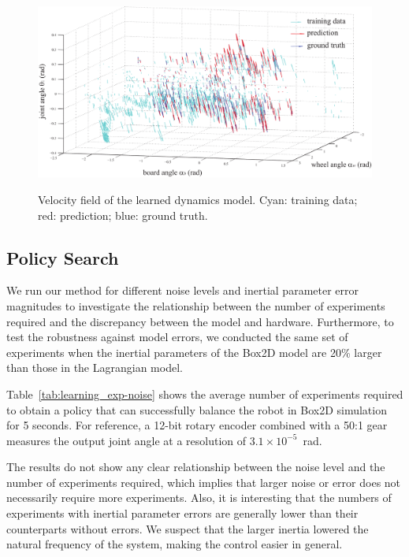 \documentclass[letterpaper, 10 pt, conference]{ieeeconf}
\begin{document}
\begin{figure}[tb]
\begin{center}
\includegraphics[width=120mm]{eps/field_00003_l03.pdf}\\
\caption{Velocity field of the learned dynamics model. Cyan: training
 data; red: prediction; blue: ground truth.}
\label{fig:learning_vector3d}
\end{center}
\end{figure}

\subsection{Policy Search}



We run our method for different noise levels and inertial parameter
error magnitudes to investigate the relationship between the number of
experiments required and the discrepancy between the model and hardware.
Furthermore, to test the robustness against model errors, we conducted
the same set of experiments when the inertial parameters of the Box2D
model are 20\% larger than those in the Lagrangian model.

Table~\ref{tab:learning_exp-noise} shows the average number of experiments
required to obtain a policy that can successfully balance the robot
in Box2D simulation for 5 seconds.
For reference, a 12-bit rotary encoder combined with a 50:1 gear
measures the output joint angle at a resolution of $3.1\times 10^{-5}$~rad.

The results do not show any clear relationship between the noise level
and the number of experiments required, which
implies that larger noise or error does not necessarily require more
experiments. 
Also, it is interesting that the numbers of experiments with inertial
parameter errors are generally lower than their counterparts without
errors.
We suspect that the larger inertia lowered the natural frequency of the
system, making the control easier in general.
\end{document}
